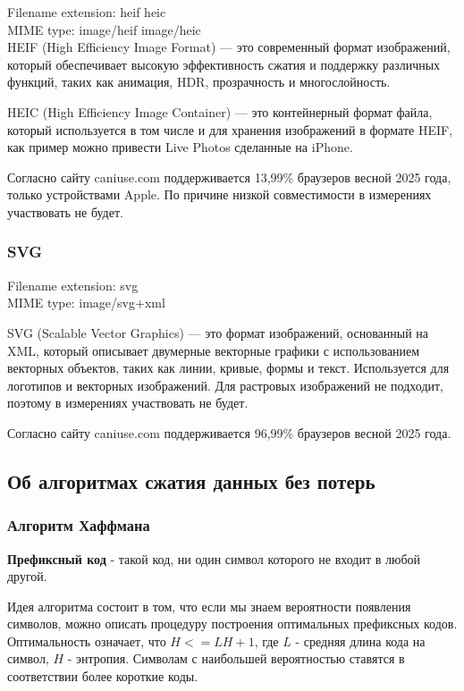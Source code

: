 \documentclass[12pt]{article}
\begin{document}
Filename extension: heif heic\\
MIME type: image/heif image/heic\\

HEIF (High Efficiency Image Format) — это современный формат изображений,
который обеспечивает высокую эффективность сжатия и поддержку различных функций,
таких как анимация, HDR, прозрачность и многослойность.

HEIC (High Efficiency Image Container) — это контейнерный формат файла,
который используется в том числе и для хранения изображений в формате HEIF,
как пример можно привести Live Photos сделанные на iPhone.

Согласно сайту caniuse.com поддерживается 13,99\% браузеров весной 2025 года,
только устройствами Apple. По причине низкой совместимости в измерениях участвовать не будет.

\subsubsection{SVG}

Filename extension: svg\\
MIME type: image/svg+xml

SVG (Scalable Vector Graphics) — это формат изображений, основанный на XML,
который описывает двумерные векторные графики с использованием векторных объектов,
таких как линии, кривые, формы и текст. Используется для логотипов и векторных изображений.
Для растровых изображений не подходит, поэтому в измерениях участвовать не будет.

Согласно сайту caniuse.com поддерживается 96,99\% браузеров весной 2025 года.

\subsection{Об алгоритмах сжатия данных без потерь}

\subsubsection{Алгоритм Хаффмана}

\textbf{Префиксный код} - такой код, ни один символ которого не входит в любой другой.

Идея алгоритма состоит в том, что если мы знаем вероятности появления символов,
можно описать процедуру построения оптимальных префиксных кодов. Оптимальность
означает, что $H <= L H + 1$, где $L$ - средняя длина кода на символ, $H$ - энтропия.
Символам с наибольшей вероятностью ставятся в соответствии более короткие коды.
\end{document}
